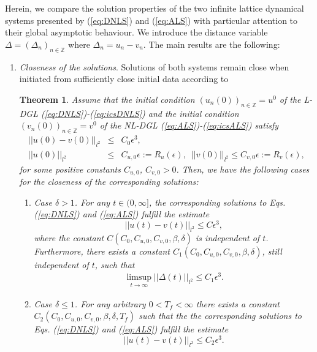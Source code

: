 \documentclass[preprintnumbers,amsmath,amssymb]{revtex4}
\newtheorem{theorem}{Theorem}[section]
\begin{document}
Herein, we compare the solution properties of the two infinite lattice dynamical systems presented by (\ref{eq:DNLS}) and (\ref{eq:ALS}) with particular attention to their global  asymptotic behaviour. 
We introduce the distance variable 
$\Delta =(\Delta_n)_{n\in \mathbb{Z}}$ where $\Delta_n=u_n-v_n$. The main results are the following:
\begin{enumerate}
	\item {\em Closeness of the solutions}.  Solutions of both systems remain close when initiated from sufficiently close initial data according to 
\begin{theorem}
	\label{Theorem:closeness}	
	Assume that the initial condition $(u_n(0))_{n\in {\mathbb{Z}}}=u^0$ of the L-DGL (\ref{eq:DNLS})-(\ref{eq:icsDNLS}) and the initial condition $(v_n(0))_{n\in {\mathbb{Z}}}=v^0$ of the NL-DGL  (\ref{eq:ALS})-(\ref{eq:icsALS}) satisfy 
	\begin{eqnarray}
	|| u(0)-v(0)||_{l^2}&\le& C_0 \epsilon^3,\label{eq:distance0}\\
	|| u(0)||_{l^2}&\le& C_{u,0}\epsilon:=R_u(\epsilon),\,\,\, || v(0)||_{l^2}\le C_{v,0}\epsilon:=R_v(\epsilon),\label{eq:initialuv}
	\end{eqnarray}
	for some positive constants $C_{u,0}$, $C_{v,0}>0$. Then, we have the following cases for the closeness of the corresponding solutions:
	\begin{enumerate}
		\item Case $\delta>1$.  For any $t\in (0, \infty]$, the corresponding solutions to Eqs. (\ref{eq:DNLS}) and (\ref{eq:ALS}) fulfill  the estimate
		\begin{equation}
		|| u(t)-v(t)||_{l^2}\le C \epsilon^3,\label{eq:boundy}
		\end{equation}
		where the constant $C(C_0,C_{u,0},C_{v,0},\beta, \delta)$ is independent of $t$. Furthermore, there exists a constant $C_1(C_0,C_{u,0},C_{v,0},\beta, \delta)$, still independent of $t$, such that
		\begin{eqnarray}
		\label{cd1}
		\limsup_{t\rightarrow\infty}||\Delta(t)||_{l^2}\leq C_1\epsilon^3.
		\end{eqnarray}
		\item Case $\delta\leq 1$.  For any arbitrary $0<T_f<\infty$ there exists a constant $C_2(C_0,C_{u,0},C_{v,0},\beta, \delta,T_f)$ such that the the corresponding solutions to Eqs. (\ref{eq:DNLS}) and (\ref{eq:ALS}) fulfill  the estimate
		\begin{equation}
		\label{eq:boundylin}
		|| u(t)-v(t)||_{l^2}\le C_2\epsilon^3.

\end{equation}
\end{enumerate}
\end{theorem}
\end{enumerate}
\end{document}
